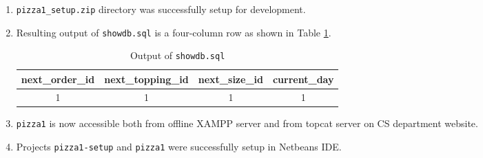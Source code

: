 \begin{enumerate}[label=(\alph*)]
\item \texttt{pizza1\_setup.zip} directory was successfully setup for development.

\item Resulting output of \texttt{showdb.sql} is a four-column row as shown in Table \ref{tab41}.

\begin{table}[H]\centering
\begin{tabular}{| c | c | c | c |}
\hline
next\_order\_id & next\_topping\_id & next\_size\_id & current\_day\\ 
\hline
1 & 1 & 1 & 1\\
\hline
\end{tabular}
\caption{Output of \texttt{showdb.sql}}\label{tab41}
\end{table}

\item \texttt{pizza1} is now accessible both from offline XAMPP server and from topcat server on CS department website.

\item Projects \texttt{pizza1-setup} and \texttt{pizza1} were successfully setup in Netbeans IDE.
\end{enumerate}
